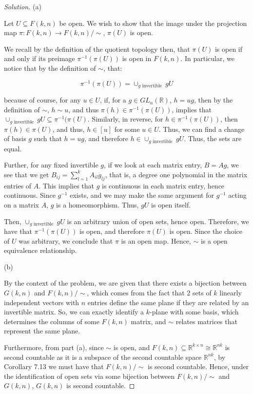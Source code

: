 \documentclass[10pt]{article}
\begin{document}
\begin{proof}[Solution]

(a)

Let $U \subseteq F(k,n)$ be open. We wish to show that the image under the projection map $\pi: F(k,n) \to F(k,n)/\sim$, $\pi(U)$ is open.

We recall by the definition of the quotient topology then, that $\pi(U)$ is open if and only if its preimage $\pi^{-1}(\pi(U))$ is open in $F(k,n)$. In particular, we notice that by the definition of $\sim$, that:

$$\pi^{-1}(\pi(U)) = \cup_{g \text{ invertible }} gU $$

because of course, for any $u \in U$, if, for a $g \in GL_n(\mathbb{R})$, $h  = ug$, then by the definition of $\sim$, $h \sim u$, and thus $\pi(h) \in \pi^{-1}(\pi(U))$, implies that $\cup_{g \text{ invertible }} gU \subseteq \pi^{-1}(\pi(U)$. Similarly, in reverse, for $h \in \pi^{-1}(\pi(U))$, then $\pi(h) \in \pi(U)$, and thus, $h \in [u]$ for some $u \in U$. Thus, we can find a change of basis $g$ such that $h = ug$, and therefore $h \in \cup_{g \text{ invertible }} gU$. Thus, the sets are equal.

Further, for any fixed invertible $g$, if we look at each matrix entry, $B = Ag$, we see that we get $B_{ij} = \sum_{l=1}^k A_{il}g_{lj}$, that is, a degree one polynomial in the matrix entries of $A$. This implies that $g$ is continuous in each matrix entry, hence continuous. Since $g^{-1}$ exists, and we may make the same argument for $g^{-1}$ acting on a matrix $A$, $g$ is a homeomorphism. Thus, $gU$ is open itself.

Then, $\cup_{g \text{ invertible }} gU$ is an arbitrary union of open sets, hence open. Therefore, we have that $\pi^{-1}(\pi(U))$ is open, and therefore $\pi(U)$ is open. Since the choice of $U$ was arbitrary, we conclude that $\pi$ is an open map. Hence, $\sim$ is a open equivalence relationship.

(b)

By the context of the problem, we are given that there exists a bijection between $G(k,n)$ and $F(k,n)/\sim$, which comes from the fact that 2 sets of $k$ linearly independent vectors with $n$ entries define the same plane if they are related by an invertible matrix. So, we can exactly identify a $k$-plane with some basis, which determines the columns of some $F(k,n)$ matrix, and $\sim$ relates matrices that represent the same plane.

Furthermore, from part (a), since $\sim$ is open, and $F(k,n) \subseteq \mathbb{R}^{k \times n} \cong \mathbb{R}^{nk}$ is second countable as it is a subspace of  the second countable space $\mathbb{R}^{nk}$, by Corollary 7.13 we must have that $F(k,n)/\sim$ is second countable. Hence, under the identification of open sets via some bijection between $F(k,n)/\sim$ and $G(k,n)$, $G(k,n)$ is second countable.


\end{proof}
\end{document}
